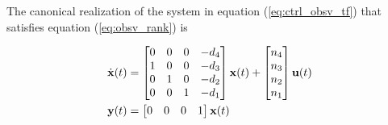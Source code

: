 The canonical \gls{realization} of the \gls{system} in equation
(\ref{eq:ctrl_obsv_tf}) that satisfies equation (\ref{eq:obsv_rank}) is

\begin{align}
  \dot{\mathbf{x}}(t) &=
  \begin{bmatrix}
    0 & 0 & 0 & -d_4 \\
    1 & 0 & 0 & -d_3 \\
    0 & 1 & 0 & -d_2 \\
    0 & 0 & 1 & -d_1
  \end{bmatrix}
  \mathbf{x}(t) +
  \begin{bmatrix}
    n_4 \\
    n_3 \\
    n_2 \\
    n_1
  \end{bmatrix}
  \mathbf{u}(t) \\
  \mathbf{y}(t) &=
  \begin{bmatrix}
    0 & 0 & 0 & 1
  \end{bmatrix}
  \mathbf{x}(t)
\end{align}
